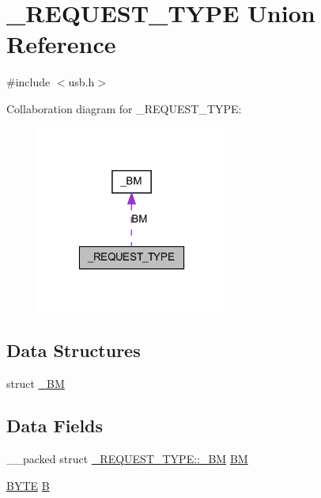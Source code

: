 \hypertarget{union___r_e_q_u_e_s_t___t_y_p_e}{
\section{\_\-REQUEST\_\-TYPE Union Reference}
\label{union___r_e_q_u_e_s_t___t_y_p_e}
}


{\ttfamily \#include $<$usb.h$>$}



Collaboration diagram for \_\-REQUEST\_\-TYPE:
\nopagebreak
\begin{figure}[H]
\begin{center}
\leavevmode
\includegraphics[width=178pt]{union___r_e_q_u_e_s_t___t_y_p_e__coll__graph}
\end{center}
\end{figure}
\subsection*{Data Structures}
\begin{DoxyCompactItemize}
\item 
struct \hyperlink{struct___r_e_q_u_e_s_t___t_y_p_e_1_1___b_m}{\_\-BM}
\end{DoxyCompactItemize}
\subsection*{Data Fields}
\begin{DoxyCompactItemize}
\item 
\_\-\_\-packed struct \hyperlink{struct___r_e_q_u_e_s_t___t_y_p_e_1_1___b_m}{\_\-REQUEST\_\-TYPE::\_\-BM} \hyperlink{union___r_e_q_u_e_s_t___t_y_p_e_a896773570e2fb212ad62245fe6e95f94}{BM}
\item 
\hyperlink{type_8h_a4ae1dab0fb4b072a66584546209e7d58}{BYTE} \hyperlink{union___r_e_q_u_e_s_t___t_y_p_e_abc9e2377dd2619b51b588323fe9984ea}{B}
\end{DoxyCompactItemize}



